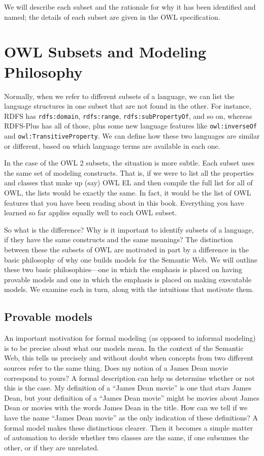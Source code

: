 We will describe each subset and the rationale for why it has been
identified and named; the details of each subset are given in the OWL
specification.

\section{OWL Subsets and Modeling Philosophy}

Normally, when we refer to different subsets of a language, we can list
the language structures in one subset that are not found in the other.
For instance, RDFS has \texttt{rdfs:domain}, \texttt{rdfs:range}, \texttt{rdfs:subPropertyOf}, and
so on, whereas RDFS-Plus has all of those, plus some new language
features like \texttt{owl:inverseOf} and \texttt{owl:TransitiveProperty}. We can define
how these two languages are similar or different, based on which
language terms are available in each one.

In the case of the OWL 2 subsets, the situation is more subtle. Each
subset uses the same set of modeling constructs. That is, if we were to
list all the properties and classes that make up (say) OWL EL and then
compile the full list for all of OWL, the lists would be exactly the
same. In fact, it would be the list of OWL features that you have been
reading about in this book. Everything you have learned so far applies
equally well to each OWL subset.

So what is the difference? Why is it important to identify subsets of a
language, if they have the same constructs and the same meanings? The
distinction between these the subsets of OWL are motivated in part by a
difference in the basic philosophy of why one builds models for the
Semantic Web. We will outline these two basic philosophies---one in
which the emphasis is placed on having provable models and one in which
the emphasis is placed on making executable models. We examine each in
turn, along with the intuitions that motivate them.

\subsection{Provable models}

An important motivation for formal modeling (as opposed to informal
modeling) is to be precise about what our models mean. In the context of
the Semantic Web, this tells us precisely and without doubt when
concepts from two different sources refer to the same thing. Does my
notion of a James Dean movie correspond to yours? A formal description
can help us determine whether or not this is the case. My definition of
a ``James Dean movie'' is one that stars James Dean, but your definition
of a ``James Dean movie'' might be movies about James Dean or movies
with the words James Dean in the title. How can we tell if we have the
name ``James Dean movie'' as the only indication of these definitions? A
formal model makes these distinctions clearer. Then it becomes a simple
matter of automation to decide whether two classes are the same, if one
subsumes the other, or if they are unrelated.

